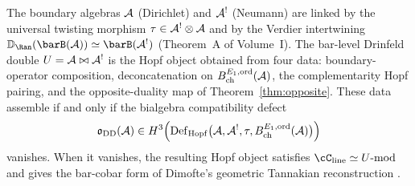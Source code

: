 \begin{remark}
\label{rem:drinfeld-double-programme}
The boundary algebras $\mathcal{A}$ (Dirichlet) and $\mathcal{A}^!$ (Neumann) are
linked by the universal twisting morphism
$\tau \in \mathcal{A}^! \otimes \mathcal{A}$ and by the Verdier intertwining
$\mathbb{D}_{\Ran}(\barB(\cA)) \simeq \barB(\cA^!)$ (Theorem~A of
Volume~I). The bar-level Drinfeld double
$U=\mathcal{A}\bowtie\mathcal{A}^!$ is the Hopf object obtained from four data:
boundary-operator composition, deconcatenation on
$B^{E_1,\mathrm{ord}}_{\mathrm{ch}}(\mathcal{A})$, the complementarity Hopf
pairing, and the opposite-duality map of Theorem~\ref{thm:opposite}.
These data assemble if and only if the bialgebra compatibility defect
\[
 \mathfrak{o}_{\mathrm{DD}}(\mathcal{A})
 \in
 H^3\!\left(
   \operatorname{Def}_{\mathrm{Hopf}}\bigl(\mathcal{A},\mathcal{A}^!,\tau,
   B^{E_1,\mathrm{ord}}_{\mathrm{ch}}(\mathcal{A})\bigr)
 \right)
\]
vanishes. When it vanishes, the resulting Hopf object satisfies
$\cC_{\mathrm{line}}\simeq U\text{-mod}$ and gives the bar-cobar form
of Dimofte's geometric Tannakian reconstruction \cite{Dimofte25}.
\end{remark}

